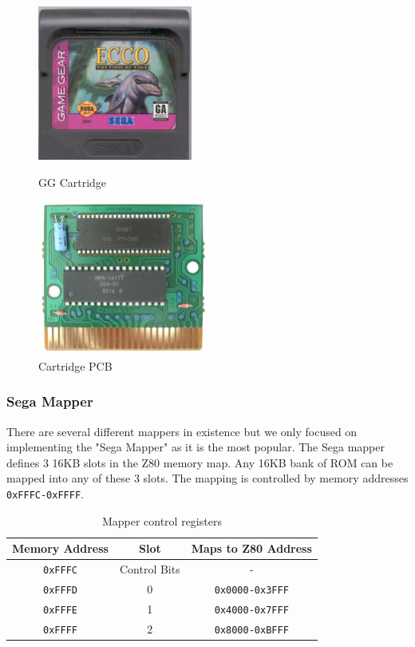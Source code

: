 \documentclass{article}
\begin{document}
\begin{figure}[H]
    \centering
    \begin{minipage}[b]{0.3\linewidth}
        \centering
        \includegraphics[height=2in]{../images/gg_cart.png}
        \caption{GG Cartridge \protect\cite{gg_cart}}
        \label{fig:gg_cart}
    \end{minipage}
    \hspace{1.5cm}
    \begin{minipage}[b]{0.3\linewidth}
        \centering
        \includegraphics[height=2in]{../images/gg_cart_pcb.png}
        \caption{Cartridge PCB \protect\cite{gg_cart_pcb}}
        \label{fig:gg_cart_pcb}
    \end{minipage}
\end{figure}

\subsubsection{Sega Mapper}
There are several different mappers in existence but we only focused on
implementing the "Sega Mapper" as it is the most popular.  The Sega mapper
defines 3 16KB slots in the Z80 memory map. Any 16KB bank of ROM can be mapped
into any of these 3 slots. The mapping is controlled by memory addresses
\texttt{0xFFFC-0xFFFF}.

\begin{table}[H]
    \centering
    \begin{tabular}{ccc}
        \toprule
        \textbf{Memory Address} & \textbf{Slot} & \textbf{Maps to Z80 Address} \\
        \midrule
        \texttt{0xFFFC} & Control Bits & - \\
        \texttt{0xFFFD} & 0            & \texttt{0x0000-0x3FFF} \\
        \texttt{0xFFFE} & 1            & \texttt{0x4000-0x7FFF} \\
        \texttt{0xFFFF} & 2            & \texttt{0x8000-0xBFFF} \\
        \bottomrule
    \end{tabular}
    \caption{Mapper control registers \protect\cite{mapper}}
\end{table}
\end{document}
